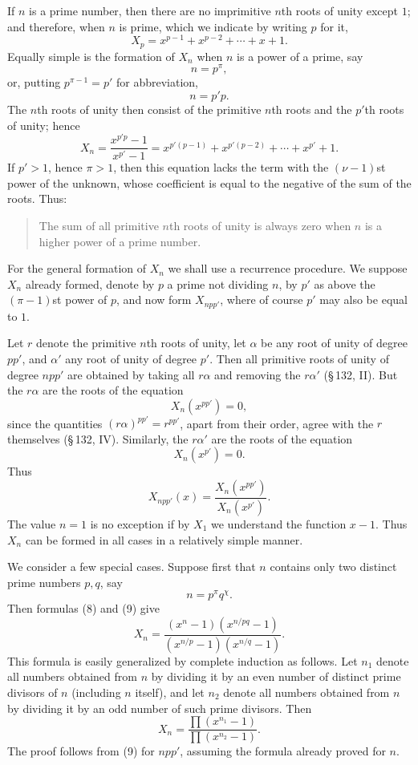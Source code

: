 \documentclass[11pt]{article}
\begin{document}
If $n$ is a prime number, then there are no imprimitive $n$th roots of unity except $1$; and therefore, when $n$ is prime, which we indicate by writing $p$ for it,
\[
\tag{7}        X_p=x^{p-1}+x^{p-2}+\cdots+x+1.
\]
Equally simple is the formation of $X_n$ when $n$ is a power of a prime, say
\[
        n=p^\pi,
\]
or, putting $p^{\pi-1}=p'$ for abbreviation,
\[
        n=p'p.
\]
The $n$th roots of unity then consist of the primitive $n$th roots and the $p'$th roots of unity; hence
\[
\tag{8}        X_n=\frac{x^{p'p}-1}{x^{p'}-1}
=x^{p'(p-1)}+x^{p'(p-2)}+\cdots+x^{p'}+1.
\]
If $p'>1$, hence $\pi>1$, then this equation lacks the term with the $(\nu-1)$st power of the unknown, whose coefficient is equal to the negative of the sum of the roots. Thus:
\begin{quote}
The sum of all primitive $n$th roots of unity is always zero when $n$ is a higher power of a prime number.
\end{quote}

For the general formation of $X_n$ we shall use a recurrence procedure. We suppose $X_n$ already formed, denote by $p$ a prime not dividing $n$, by $p'$ as above the $(\pi-1)$st power of $p$, and now form $X_{npp'}$, where of course $p'$ may also be equal to $1$.

Let $r$ denote the primitive $n$th roots of unity, let $\alpha$ be any root of unity of degree $pp'$, and $\alpha'$ any root of unity of degree $p'$. Then all primitive roots of unity of degree $npp'$ are obtained by taking all $r\alpha$ and removing the $r\alpha'$ (\S\,132, II). But the $r\alpha$ are the roots of the equation
\[
        X_n(x^{pp'})=0,
\]
since the quantities $(r\alpha)^{pp'}=r^{pp'}$, apart from their order, agree with the $r$ themselves (\S\,132, IV). Similarly, the $r\alpha'$ are the roots of the equation
\[
        X_n(x^{p'})=0.
\]
Thus
\[
\tag{9}        X_{npp'}(x)=\frac{X_n(x^{pp'})}{X_n(x^{p'})}.
\]
The value $n=1$ is no exception if by $X_1$ we understand the function $x-1$. Thus $X_n$ can be formed in all cases in a relatively simple manner.

We consider a few special cases. Suppose first that $n$ contains only two distinct prime numbers $p,q$, say
\[
        n=p^\pi q^\chi.
\]
Then formulas (8) and (9) give
\[
        X_n=\frac{(x^n-1)(x^{n/pq}-1)}{(x^{n/p}-1)(x^{n/q}-1)}.
\]
This formula is easily generalized by complete induction as follows. Let $n_1$ denote all numbers obtained from $n$ by dividing it by an even number of distinct prime divisors of $n$ (including $n$ itself), and let $n_2$ denote all numbers obtained from $n$ by dividing it by an odd number of such prime divisors. Then
\[
\tag{10}       X_n=\frac{\prod(x^{n_1}-1)}{\prod(x^{n_2}-1)}.
\]
The proof follows from (9) for $npp'$, assuming the formula already proved for $n$.
\end{document}
